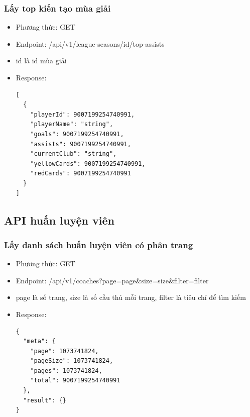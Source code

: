 \documentclass[../BTL.tex]{subfiles}
\begin{document}
\subsubsection{ Lấy top kiến tạo mùa giải}
\begin{itemize}
    \item Phương thức: GET
    \item Endpoint: /api/v1/league-seasons/{id}/top-assists
    \item {id} là id mùa giải
    \item Response:
        \begin{verbatim}
[
  {
    "playerId": 9007199254740991,
    "playerName": "string",
    "goals": 9007199254740991,
    "assists": 9007199254740991,
    "currentClub": "string",
    "yellowCards": 9007199254740991,
    "redCards": 9007199254740991
  }
]
        \end{verbatim}
\end{itemize}
\subsection{ API huấn luyện viên}
\subsubsection{ Lấy danh sách huấn luyện viên có phân trang}
\begin{itemize}
    \item Phương thức: GET
    \item Endpoint: /api/v1/coaches?page={page}\&size={size}\&filter={filter}
    \item {page} là số trang, {size} là số cầu thủ mỗi trang, {filter} là tiêu chí để tìm kiếm
    \item Response:
        \begin{verbatim}
{
  "meta": {
    "page": 1073741824,
    "pageSize": 1073741824,
    "pages": 1073741824,
    "total": 9007199254740991
  },
  "result": {}
}
        \end{verbatim}
\end{itemize}
\end{document}
